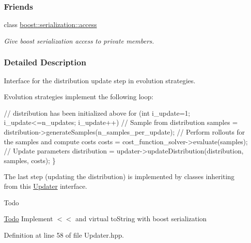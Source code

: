 \subsubsection*{Friends}
\begin{DoxyCompactItemize}
\item 
class \hyperlink{classDmpBbo_1_1Updater_ac98d07dd8f7b70e16ccb9a01abf56b9c}{boost\+::serialization\+::access}
\begin{DoxyCompactList}\small\item\em Give boost serialization access to private members. \end{DoxyCompactList}\end{DoxyCompactItemize}


\subsubsection{Detailed Description}
Interface for the distribution update step in evolution strategies. 

Evolution strategies implement the following loop\+: 
\begin{DoxyCode}
\textcolor{comment}{// distribution has been initialized above}
\textcolor{keywordflow}{for} (\textcolor{keywordtype}{int} i\_update=1; i\_update<=n\_updates; i\_update++)
  \textcolor{comment}{// Sample from distribution}
  samples = distribution->generateSamples(n\_samples\_per\_update);
  \textcolor{comment}{// Perform rollouts for the samples and compute costs}
  costs = cost\_function\_solver->evaluate(samples);
  \textcolor{comment}{// Update parameters}
  distribution = updater->updateDistribution(distribution, samples, costs);
\}
\end{DoxyCode}


The last step (updating the distribution) is implemented by classes inheriting from this \hyperlink{classDmpBbo_1_1Updater}{Updater} interface.

\begin{DoxyRefDesc}{Todo}
\item[\hyperlink{todo__todo000004}{Todo}]Implement $<$$<$ and virtual to\+String with boost serialization \end{DoxyRefDesc}


Definition at line 58 of file Updater.\+hpp.



